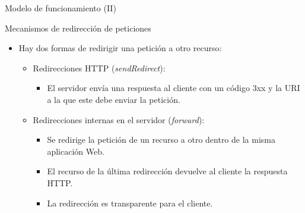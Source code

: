 \begin{slide}{Modelo de funcionamiento (II)}

\begin{center}
\end{center}

\end{slide}

\begin{slide}{Mecanismos de redirección de peticiones}

  \begin{itemize}
  \item Hay dos formas de redirigir una petición a otro recurso:
    \begin{itemize}
    \item Redirecciones HTTP  (\emph{sendRedirect}):
      \begin{itemize}
      \item El servidor envía una respuesta al 
        cliente con un código 3xx y la URI a la que este debe 
        enviar la petición.
      \end{itemize}
    \item Redirecciones internas en el servidor (\emph{forward}):
      \begin{itemize}
      \item Se redirige la petición de un recurso a otro dentro
        de la misma aplicación Web.
      \item El recurso de la última redirección devuelve al cliente
        la respuesta HTTP.
      \item La redirección es transparente para el cliente.
      \end{itemize}
    \end{itemize}
  \end{itemize}
\end{slide}

